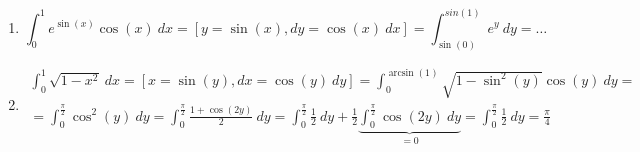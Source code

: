 \begin{properties}
    \begin{example}
        \begin{enumerate}
            \item 
            \[
                \int_0^1 e^{\sin(x)} \cos(x) \ dx = [y = \sin(x), dy = \cos(x)\ dx] 
                = \int_{\sin(0)}^{sin(1)} e^y \ dy = \ldots
            \]
            \item 
            \[
                \begin{gathered}
                    \int_0^1 \sqrt{1 - x^2} \ dx = [x = \sin(y), dx 
                    = \cos(y)\ dy] =
                    \int_0^{\arcsin(1)} \sqrt{1 - \sin^2(y)} \cos(y) \ dy 
                    =\\= \int_0^{\frac \pi 2} \cos^2(y) \ dy 
                    = \int_0^{\frac \pi 2} \frac {1 + \cos(2y)} 2 \ dy
                    = \int_0^{\frac \pi 2} \frac 1 2 \ dy + 
                    \frac{1}{2}\underbrace{\int_0^{\frac \pi 2} \cos(2y) \ dy}_{=0}
                    = \int_0^{\frac \pi 2} \frac 1 2 \ dy
                    = \frac \pi 4
                \end{gathered}
            \]
        \end{enumerate}
    \end{example}
\end{properties}
